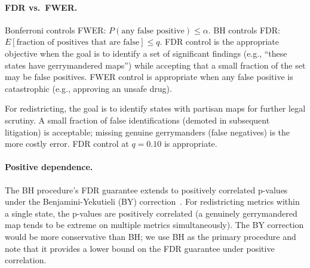 \paragraph{FDR vs.\ FWER.}
Bonferroni controls FWER: $P(\text{any false positive}) \leq \alpha$.
BH controls FDR: $E[\text{fraction of positives that are false}] \leq q$.
FDR control is the appropriate objective when the goal is to identify
a set of significant findings (e.g., ``these states have gerrymandered maps'')
while accepting that a small fraction of the set may be false positives.
FWER control is appropriate when any false positive is catastrophic
(e.g., approving an unsafe drug).

For redistricting, the goal is to identify states with partisan maps
for further legal scrutiny.
A small fraction of false identifications (demoted in subsequent
litigation) is acceptable; missing genuine gerrymanders (false negatives)
is the more costly error.
FDR control at $q = 0.10$ is appropriate.

\paragraph{Positive dependence.}
The BH procedure's FDR guarantee extends to positively correlated
p-values under the Benjamini-Yekutieli (BY) correction~\citep{by2001}.
For redistricting metrics within a single state, the p-values are
positively correlated (a genuinely gerrymandered map tends to be
extreme on multiple metrics simultaneously).
The BY correction would be more conservative than BH; we use BH
as the primary procedure and note that it provides a lower bound
on the FDR guarantee under positive correlation.

